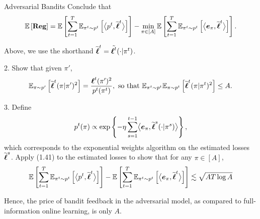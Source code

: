 \begin{exercise}[]{Adversarial Bandits}
Conclude that 
\begin{equation*}
	\EE{\Reg} = \EE{\sum_{t=1}^T \EEs{\biprod{p^t}{\wt \bsl^t}}{\pi^t \sim p^t}}  -\min_{\pi \in
	[A]}\EE{\sum_{t=1}^T\EEs{\biprod{\boldsymbol{e}_\pi}{\wt \bsl^t}}{\pi^t \sim p^t}}.
\end{equation*}

Above, we use the shorthand $\wt \bsl^t = \ltt(\cdot|\pi^t)$.
        
2. Show that given $\pi'$,
\[ \EEs{\wt \bsl^t(\pi|\pi')^2}{\pi \sim p'}= \frac{\bsl^t(\pi')^2}{p^t(\pi^t)}, \text{ so that  } \mathbb{E}_{\pi^t\sim p^t}\EEs{\wt \bsl^t(\pi | \pi^t)^2}{\pi \sim p^t}\leq A.\]

3. Define \[ p^t(\pi) \propto \exp \left\{-\eta \sum_{s=1}^{t-1}\biprod{\boldsymbol{e}_\pi}{\wt \bsl^s(\cdot|\pi^s)}\right\},\]
which corresponds to the exponential weights algorithm on the estimated losses $\wt \bsl^s$.
 Apply (1.41) to the estimated losses to show that for any $\pi \in [A]$,
 \[ \EE{\sum_{t=1}^T \EEs{\biprod{p^t}{\wt \bsl^t}}{\pi^t \sim p^t}}-\EE{\sum_{t=1}^T \EEs{\biprod{\boldsymbol{e}_\pi}{\wt \bsl^t}}{\pi^t \sim p^t}} \lesssim \sqrt{AT\log A}\]

 Hence, the price of bandit feedback in the adversarial model, as compared to full-information online learning, is only $A$.
\end{exercise}

